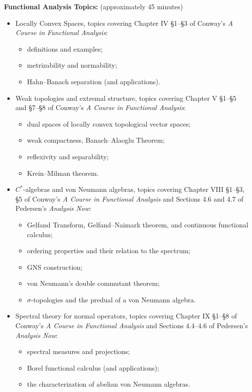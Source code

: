 \documentclass[10pt]{mypackage}
\begin{document}
\textbf{Functional Analysis Topics:} (approximately 45 minutes)
\begin{itemize}
  \item Locally Convex Spaces, topics covering Chapter IV \S 1--\S 3 of Conway's \textit{A Course in Functional Analysis}:
    \begin{itemize}
      \item definitions and examples;
      \item metrizability and normability;
      \item Hahn--Banach separation (and applications).
    \end{itemize}
  \item Weak topologies and extremal structure, topics covering Chapter V \S 1--\S 5 and \S 7--\S 8 of Conway's \textit{A Course in Functional Analysis}:
    \begin{itemize}
      \item dual spaces of locally convex topological vector spaces;
      \item weak compactness, Banach--Alaoglu Theorem;
      \item reflexivity and separability;
      \item Krein--Milman theorem.
    \end{itemize}
  \item $C^{\ast}$-algebras and von Neumann algebras, topics covering Chapter VIII \S 1--\S 3, \S 5 of Conway's \textit{A Course in Functional Analysis} and Sections 4.6 and 4.7 of Pedersen's \textit{Analysis Now}:
    \begin{itemize}
      \item Gelfand Transform, Gelfand--Naimark theorem, and continuous functional calculus;
      \item ordering properties and their relation to the spectrum;
      \item GNS construction;
      \item von Neumann's double commutant theorem;
      \item $\sigma$-topologies and the predual of a von Neumann algebra.
    \end{itemize}
  \item Spectral theory for normal operators, topics covering Chapter IX \S 1--\S 8 of Conway's \textit{A Course in Functional Analysis} and Sections 4.4--4.6 of Pedersen's \textit{Analysis Now}:
    \begin{itemize}
      \item spectral measures and projections;
      \item Borel functional calculus (and applications);
      \item the characterization of abelian von Neumann algebras.
    \end{itemize}
\end{itemize}
\end{document}
